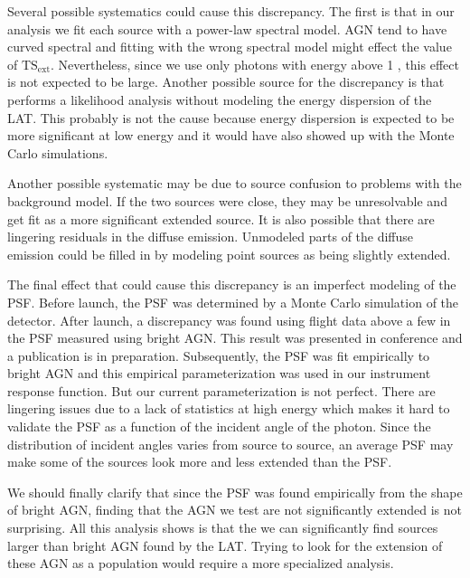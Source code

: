 \documentclass[12pt,preprint]{aastex}
\newcommand{\gev}{\text{GeV}\xspace}
\newcommand{\tsext}{{\ensuremath{\text{TS}_\text{ext}}}\xspace}
\newcommand{\pointlike}{\text{\em pointlike}\xspace}
\begin{document}
Several possible systematics could cause this discrepancy. The first is
that in our analysis we fit each source with a power-law spectral model.
AGN tend to have curved spectral and fitting with the wrong spectral
model might effect the value of \tsext. Nevertheless, since we use only
photons with energy above 1 \gev, this effect is not expected to be large.
Another possible source for the discrepancy is that \pointlike performs
a likelihood analysis without modeling the energy dispersion of the LAT.
This probably is not the cause because energy dispersion is expected to
be more significant at low energy and it would have also showed up with
the Monte Carlo simulations.

Another possible systematic may be due to source confusion to problems
with the background model. If the two sources were close,
they may be unresolvable and get fit as a more significant extended source.
It is also possible that there are lingering
residuals in the diffuse emission. Unmodeled parts of the diffuse
emission could be filled in by modeling point sources as being slightly extended.

The final effect that could cause this discrepancy is an imperfect
modeling of the PSF.  Before launch, the PSF
was determined by a Monte Carlo simulation of the detector.
After launch, a discrepancy was found using flight data above a
few \gev in the PSF measured using bright AGN.  This result
was presented in conference and a publication is in preparation.
Subsequently, the PSF was fit empirically to bright AGN and this
empirical parameterization was used in our instrument
response function.
But our current parameterization is not perfect. There are lingering
issues due to a lack of statistics at high energy which makes it hard to
validate the PSF as a function of the incident angle of the photon. Since
the distribution of incident angles varies from source to source, an
average PSF may make some of the sources look more and less extended
than the PSF.

We should finally clarify that since the PSF was found empirically
from the shape of bright AGN, finding that the AGN we test are not
significantly extended is not surprising.  All this analysis shows
is that the we can significantly find sources larger than bright AGN
found by the LAT.  Trying to look for the extension of these AGN as a
population would require a more specialized analysis.
\end{document}
